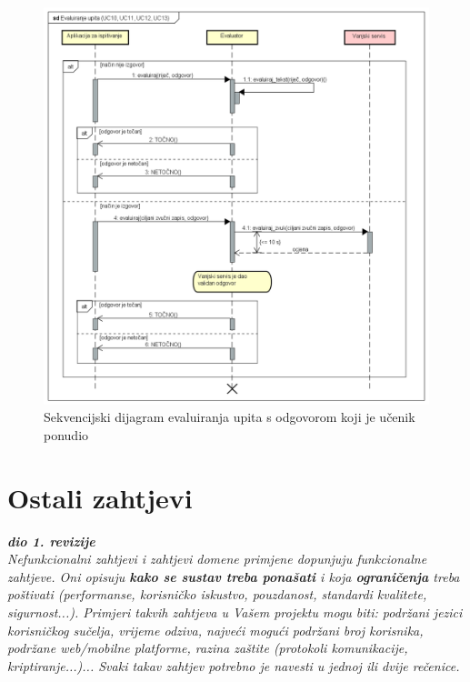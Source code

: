 				\begin{figure}[H]
					\includegraphics[width=\textwidth]{dijagrami/SD_EvaluiranjeUpita.png} %
					\caption{Sekvencijski dijagram evaluiranja upita s odgovorom koji je učenik ponudio}
					\label{fig:SD_EvaluiranjeUpita} %
				\end{figure}
	
		\section{Ostali zahtjevi}
		
			\textbf{\textit{dio 1. revizije}}\\
		 
			 \textit{Nefunkcionalni zahtjevi i zahtjevi domene primjene dopunjuju funkcionalne zahtjeve. Oni opisuju \textbf{kako se sustav treba ponašati} i koja \textbf{ograničenja} treba poštivati (performanse, korisničko iskustvo, pouzdanost, standardi kvalitete, sigurnost...). Primjeri takvih zahtjeva u Vašem projektu mogu biti: podržani jezici korisničkog sučelja, vrijeme odziva, najveći mogući podržani broj korisnika, podržane web/mobilne platforme, razina zaštite (protokoli komunikacije, kriptiranje...)... Svaki takav zahtjev potrebno je navesti u jednoj ili dvije rečenice.}
			 
			 
			 
	